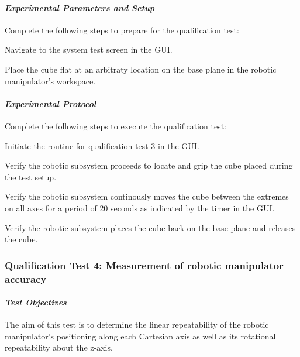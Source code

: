 \paragraph{\textit{Experimental Parameters and Setup}} 

Complete the following steps to prepare for the qualification test:

\begin{compactenum}
    \item Navigate to the system test screen in the GUI.
    \item Place the cube flat at an arbitraty location on the base plane in the robotic manipulator's workspace.
\end{compactenum}

\paragraph{\textit{Experimental Protocol}}

Complete the following steps to execute the qualification test:

\begin{compactenum}
    \item Initiate the routine for qualification test 3 in the GUI.
    \item Verify the robotic subsystem proceeds to locate and grip the cube placed during the test setup.
    \item Verify the robotic subsystem continously moves the cube between the extremes on all axes for a period of 20 seconds as indicated by the timer in the GUI.
    \item Verify the robotic subsystem places the cube back on the base plane and releases the cube.
\end{compactenum}

\subsubsection*{Qualification Test 4: Measurement of robotic manipulator accuracy}

\paragraph{\textit{Test Objectives}}

The aim of this test is to determine the linear repeatability of the robotic manipulator's positioning along each Cartesian axis as well as its rotational repeatability about the z-axis.

